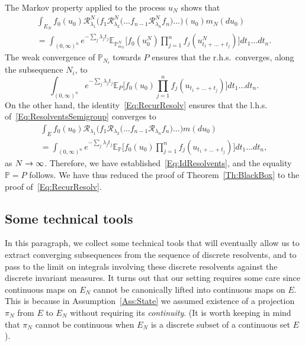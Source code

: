 \documentclass[10pt]{amsart}
\theoremstyle{definition}\newtheorem{defi}[theo]{Definition}\newtheorem{rema}[theo]{Remark}\newtheorem{exam}[theo]{Example}\newtheorem{exem}[theo]{Example}\newtheorem{nota}[theo]{Notation}
\theoremstyle{plain}
\newcommand{\bbE}{\mathbb{E}}
\newcommand{\bbP}{\mathbb{P}}
\newcommand{\cR}{\mathcal{R}}
\renewcommand*{\to}{\mathchoice{\longrightarrow}{\rightarrow}{\rightarrow}{\rightarrow}}
\begin{document}
The Markov property applied to the process $u_N$ shows that
\begin{multline}\label{Eq:ResolventsSemigroup}
\int_{E_N} f_0(u_0)\cR^N_{\lambda_1} \Big(f_1\cR^N_{\lambda_2} \Big(\dots f_{n-1} \cR^N_{\lambda_n} f_n\Big)\dots\Big) (u_0) m_N(du_0) \\
= \int_{(0,\infty)^n} e^{-\sum_j \lambda_j t_j} \bbE_{\bbP^{N}_{m_N}}\Big[f_0(u_0^N)\prod_{j=1}^n f_j(u_{t_1+\dots+t_j}^N)\Big] dt_1\dots dt_n .
\end{multline}
The weak convergence of $\bbP_{N_i}$ towards $P$ ensures that the r.h.s.~converges, along the subsequence $N_i$, to
\begin{equation}
\int_{(0,\infty)^n} e^{-\sum_j \lambda_j t_j} \bbE_P\Big[f_0(u_0)\prod_{j=1}^n f_j(u_{t_1+\dots+t_j})\Big] dt_1\dots dt_n .
\end{equation}
On the other hand, the identity~\eqref{Eq:RecurResolv} ensures that the l.h.s. of~\eqref{Eq:ResolventsSemigroup} converges to
\begin{multline*}
\int_E f_0(u_0) \cR_{\lambda_1} \Big(f_1 \cR_{\lambda_2} \Big(\dots f_{n-1} \cR_{\lambda_n} f_n\Big)\dots\Big) m(du_0) \\
= \int_{(0,\infty)^n} e^{-\sum_j \lambda_j t_j} \bbE_\bbP\Big[f_0(u_0)\prod_{j=1}^n f_j(u_{t_1+\dots+t_j})\Big] dt_1\dots dt_n ,
\end{multline*}
as $N\to\infty$. Therefore, we have established~\eqref{Eq:IdResolvents}, and the equality $\bbP=P$ follows. We have thus reduced the proof of Theorem~\ref{Th:BlackBox} to the proof of~\eqref{Eq:RecurResolv}.


\subsection{Some technical tools}\label{SubsectionCriterion}

In this paragraph, we collect some technical tools that will eventually allow us to extract converging subsequences from the sequence of discrete resolvents, and to pass to the limit on integrals involving these discrete resolvents against the discrete invariant measures. It turns out that our setting requires some care since continuous maps on $E_N$ cannot be canonically lifted into continuous maps on $E$. This is because in Assumption~\ref{Ass:State} we assumed existence of a projection $\pi_N$ from $E$ to $E_N$ without requiring its \emph{continuity}. (It is worth keeping in mind that $\pi_N$ cannot be continuous when $E_N$ is a discrete subset of a continuous set $E$).
\end{document}
